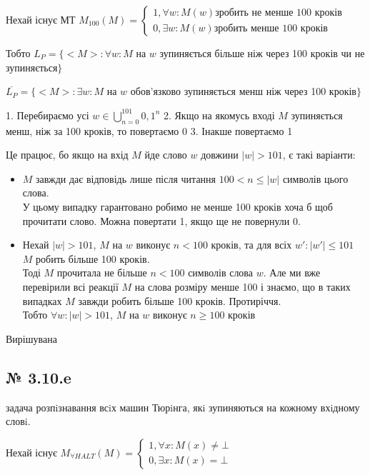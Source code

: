 \documentclass[11pt, a4paper]{article} %
\begin{document}
Нехай існує МТ $M_{100}(M) = \begin{cases}
    1, \forall w: M(w) \text{зробить не менше 100 кроків}\\
    0, \exists w: M(w) \text{зробить менше 100 кроків}
\end{cases}$

Тобто $L_P = \{<M> : \forall w: M $ на $w$ зупиняється більше ніж через 100 кроків чи не зупиняється$\}$

$\overline{L_P} = \{<M> : \exists w: M $ на $w$ обов'язково зупиняється менш ніж через 100 кроків$\}$

1. Перебираємо усі $w \in \bigcup_{n=0}^{101} {0,1}^n$
2. Якщо на якомусь вході $M$ зупиняється менш, ніж за 100 кроків, то повертаємо 0
3. Інакше повертаємо 1

Це працює, бо якщо на вхід $M$ йде слово $w$ довжини $|w|>101$, є такі варіанти:
\begin{itemize}
    \item $M$ завжди дає відповідь лише після читання $100 < n \le |w|$ символів цього слова.\\
    У цьому випадку гарантовано робимо не менше 100 кроків хоча б щоб прочитати слово. 
    Можна повертати 1, якщо ще не повернули 0.
    \item Нехай $|w| > 101$, $M$ на $w$ виконує $n < 100$ кроків, та для всіх $w' : |w'|\le 101$ $M$ робить більше 100 кроків.\\
    Тоді $M$ прочитала не більше $n < 100$ символів слова $w$. 
    Але ми вже перевірили всі реакції $M$ на слова розміру менше 100 і знаємо, що в таких випадках $M$ завжди робить більше 100 кроків.
    Протиріччя. \\ Тобто $\forall w: |w| > 101$, $M$ на $w$ виконує $n \ge 100$ кроків
\end{itemize}

\begin{mdframed}[style=ans]
    Вирішувана
\end{mdframed}

\subsection*{№ 3.10.e}
\begin{mdframed}
    задача розпiзнавання всiх машин Тюрiнга, якi зупиняються на кожному
вхiдному словi.
\end{mdframed}

Нехай існує $M_{\forall HALT}(M) = \begin{cases}
    1, \forall x: M(x) \ne \bot\\
    0, \exists x: M(x) = \bot
\end{cases}$
\end{document}
